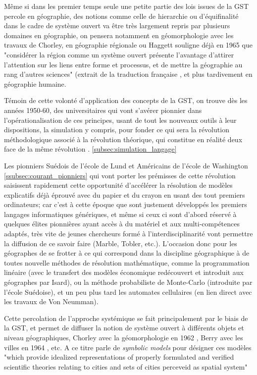 Même si dans les premier temps seule une petite partie des lois issues de la GST percole en géographie, des notions comme celle de hierarchie ou d'équifinalité dans le cadre de système ouvert va être très largement repris par plusieurs domaines en géographie, on pensera notamment en géomorphologie avec les travaux de Chorley,  en géographie régionale ou Haggett souligne déjà en 1965 que "considérer la région comme un système ouvert présente l'avantage d'attirer l'attention sur les liens entre forme et processus, et de mettre la géographie au rang d'autres sciences" (extrait de la traduction française \autocite{Hagget1973}, et plus tardivement en géographie humaine. \autocite[91]{Dauphine2003} 

Témoin de cette volonté d'application des concepts de la GST, on trouve dès les années 1950-60, des universitaires qui vont s'avérer pionnier dans l'opérationalisation de ces principes, usant de tout les nouveaux outils à leur dispositions, la simulation y compris, pour fonder ce qui sera la révolution méthodologique associé à la révolution théorique, qui constitue en réalité deux face de la même révolution \autocite[p27]{Claval1977} . \ref{subsec:simulation_langage} 

Les pionniers Suédois de l'école de Lund et Américains de l'école de Washington \ref{ssubsec:courant_pionniers} qui vont porter les prémisses de cette révolution saisissent rapidement cette opportunité d'accélérer la résolution de modèles explicatifs déjà éprouvé avec du papier et du crayon en usant des tout premiers ordinateurs; car c'est à cette époque que sont justement développés les premiers langages informatiques génériques, et même si ceux ci sont d'abord réservé à quelques élites pionnières ayant accès à du matériel et aux multi-compétences adaptés, très vite de jeunes chercheurs formé à l'interdisciplinarité vont permettre la diffusion de ce savoir faire (Marble, Tobler, etc.). L'occasion donc pour les géographes de se frotter à ce qui correspond dans la discipline géographique à de toutes nouvelle méthodes de résolution mathématique, comme la programmation linéaire (avec le transfert des modèles économique redécouvert et introduit aux géographes par Isard), ou la méthode probabiliste de Monte-Carlo (introduite par l'école Suédoise), et un peu plus tard les automates cellulaires (en lien direct avec les travaux de Von Neumman).

Cette percolation de l'approche systémique se fait principalement par le biais de la GST, et permet de diffuser la notion de système ouvert à différents objets et niveau géographiques, Chorley avec la géomorphologie en 1962 \autocite{Chorley1962}, Berry avec les villes en 1964 \autocite{Berry1964}, etc. A ce titre \autocite{Berry1964} parle de \textit{ symbolic models} \autocite{Ackoff1961} pour désigner ces modèles  "which provide idealized representations of properly formulated and verified scientific theories relating to cities and sets of cities perceveid as spatial system"

